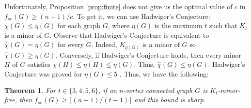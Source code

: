 \documentclass{article}
\newcommand{\mchi}{\hat{\chi}}
\newcommand{\2}{\vspace{0.2cm}}
\newtheorem{theorem}{Theorem}[section]
\begin{document}
Unfortunately, Proposition \ref{prop:finite} does not give us the optimal value of $c$ in $f_{oe}(G)\ge (n-1)/c.$ To get it, we can use
Hadwiger's Conjecture: $\chi(G)\le \eta(G)$ for each graph $G$, where $\eta(G)$ is the maximum $t$ such that $K_t$ is a minor of $G$. Observe that Hadwiger's Conjecture is equivalent to $\mchi(G)=\eta(G)$ for every $G$. Indeed, $K_{\eta(G)}$ is a minor of $G$ so $\mchi(G)\ge \eta(G).$ Conversely, if Hadwiger's Conjecture holds, then every minor $H$ of $G$ satisfies $\chi(H)\le \eta(H)\le \eta(G).$ Thus, $\mchi(G)\le \eta(G).$ Hadwiger's Conjecture was proved for $\eta(G)\le 5$ \cite{Dies}. Thus, we have the following:

\begin{theorem}\label{thm:Hadw}
For $t\in \{3,4,5,6\}$, if an $n$-vertex connected graph $G$ is $K_t$-minor-free, then $f_{oe}(G)\ge \lceil (n-1)/(t-1)\rceil$ and this bound is sharp. 
\end{theorem}
\end{document}
